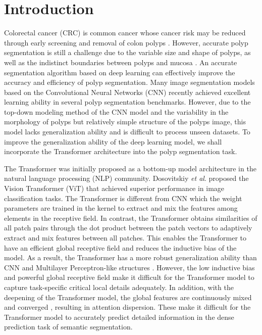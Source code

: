 \documentclass[runningheads]{llncs}
\begin{document}
\section{Introduction}
Colorectal cancer (CRC) is common cancer whose cancer risk may be reduced through early screening and removal of colon polyps \cite{pranet,UACAnet}. However, accurate polyp segmentation is still a challenge due to the variable size and shape of polyps, as well as the indistinct boundaries between polyps and mucosa \cite{pranet}. An accurate segmentation algorithm based on deep learning can effectively improve the accuracy and efficiency of polyp segmentation. Many image segmentation models based on the Convolutional Neural Networks (CNN) recently achieved excellent learning ability in several polyp segmentation benchmarks. \cite{pranet,UACAnet,caranet,srivastava2021msrf,unet++} However, due to the top-down modeling method of the CNN model and the variability in the morphology of polyps but relatively simple structure of the polyps image, this model lacks generalization ability and is difficult to process unseen datasets. To improve the generalization ability of the deep learning model, we shall incorporate the Transformer architecture into the polyp segmentation task.

The Transformer \cite{vaswani2017attention} was initially proposed as a bottom-up model architecture in the natural language processing (NLP) community. Dosovitskiy \emph{et al}. proposed the Vision Transformer (ViT) \cite{dosovitskiy2020image} that achieved superior performance in image classification tasks. The Transformer is different from CNN which the weight parameters are trained in the kernel to extract and mix the features among elements in the receptive field. In contrast, the Transformer obtains similarities of all patch pairs through the dot product between the patch vectors to adaptively extract and mix features between all patches. This enables the Transformer to have an efficient global receptive field and reduces the inductive bias of the model. As a result, the Transformer has a more robust generalization ability than CNN and Multilayer Perceptron-like structures \cite{naseer2021intriguing}. However, the low inductive bias and powerful global receptive field make it difficult for the Transformer model to capture task-specific critical local details adequately. In addition, with the deepening of the Transformer model, the global features are continuously mixed and converged \cite{zhou2021deepvit}, resulting in attention dispersion. These make it difficult for the Transformer model to accurately predict detailed information in the dense prediction task of semantic segmentation. 
\end{document}
